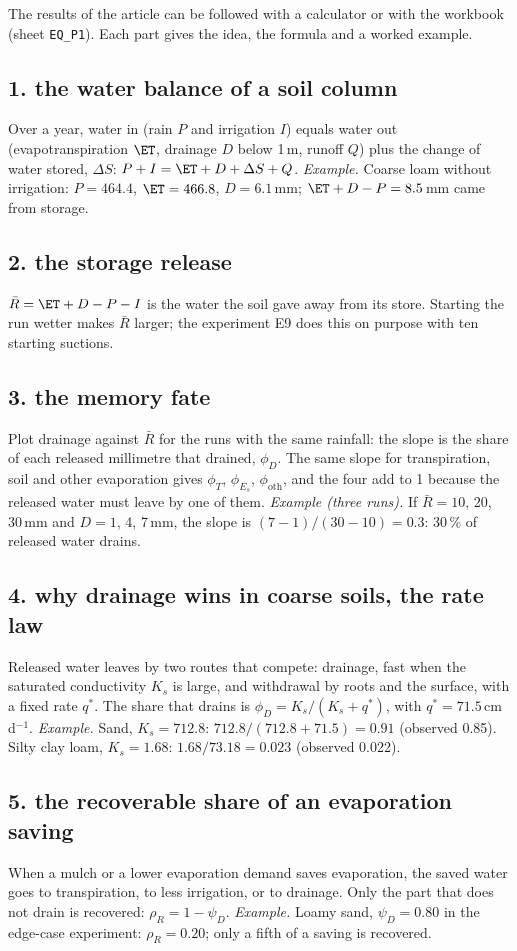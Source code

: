The results of the article can be followed with a calculator or with the workbook (sheet \texttt{EQ\_P1}). Each part gives the idea, the formula and a worked example.

\subsection{1. the water balance of a soil column}
Over a year, water in (rain $P$ and irrigation $I$) equals water out (evapotranspiration $\ET$, drainage $D$ below 1\,m, runoff $Q$) plus the change of water stored, $\Delta S$: $P+I=\ET+D+\Delta S+Q$.
\emph{Example.} Coarse loam without irrigation: $P=464.4$, $\ET=466.8$, $D=6.1$\,mm; $\ET+D-P=8.5$\,mm came from storage.

\subsection{2. the storage release}
$\bar R=\ET+D-P-I$ is the water the soil gave away from its store. Starting the run wetter makes $\bar R$ larger; the experiment E9 does this on purpose with ten starting suctions.

\subsection{3. the memory fate}
Plot drainage against $\bar R$ for the runs with the same rainfall: the slope is the share of each released millimetre that drained, $\phi_D$. The same slope for transpiration, soil and other evaporation gives $\phi_T$, $\phi_{E_s}$, $\phi_{\mathrm{oth}}$, and the four add to 1 because the released water must leave by one of them.
\emph{Example (three runs).} If $\bar R=10$, 20, 30\,mm and $D=1$, 4, 7\,mm, the slope is $(7-1)/(30-10)=0.3$: 30\,\% of released water drains.

\subsection{4. why drainage wins in coarse soils, the rate law}
Released water leaves by two routes that compete: drainage, fast when the saturated conductivity $K_s$ is large, and withdrawal by roots and the surface, with a fixed rate $q^\ast$. The share that drains is $\phi_D=K_s/(K_s+q^\ast)$, with $q^\ast=71.5$\,cm\,d$^{-1}$.
\emph{Example.} Sand, $K_s=712.8$: $712.8/(712.8+71.5)=0.91$ (observed 0.85). Silty clay loam, $K_s=1.68$: $1.68/73.18=0.023$ (observed 0.022).

\subsection{5. the recoverable share of an evaporation saving}
When a mulch or a lower evaporation demand saves evaporation, the saved water goes to transpiration, to less irrigation, or to drainage. Only the part that does not drain is recovered: $\rho_R=1-\psi_D$.
\emph{Example.} Loamy sand, $\psi_D=0.80$ in the edge-case experiment: $\rho_R=0.20$; only a fifth of a saving is recovered.

